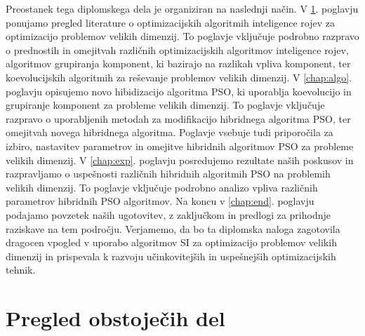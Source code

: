 Preostanek tega diplomskega dela je organiziran na naslednji način.
V \ref{chap:obsojeca.dela}. poglavju ponujamo pregled literature o optimizacijskih algoritmih inteligence rojev za optimizacijo problemov velikih dimenzij.
To poglavje vključuje podrobno razpravo o prednostih in omejitvah različnih optimizacijskih algoritmov inteligence rojev, algoritmov grupiranja komponent, ki bazirajo na razlikah vpliva komponent, ter koevolucijskih algoritmih za reševanje problemov velikih dimenzij.
V \ref{chap:algo}. poglavju opisujemo novo hibidizacijo algoritma PSO, ki uporablja koevolucijo in grupiranje komponent za probleme velikih dimenzij.
To poglavje vključuje razpravo o uporabljenih metodah za modifikacijo hibridnega algoritma PSO, ter omejitvah novega hibridnega algoritma.
Poglavje vsebuje tudi priporočila za izbiro, nastavitev parametrov in omejitve hibridnih algoritmov PSO za probleme velikih dimenzij.
V \ref{chap:exp}. poglavju posredujemo rezultate naših poskusov in razpravljamo o uspešnosti različnih hibridnih algoritmih PSO na problemih velikih dimenzij.
To poglavje vključuje podrobno analizo vpliva različnih parametrov hibridnih PSO algoritmov.
Na koncu v \ref{chap:end}. poglavju podajamo povzetek naših ugotovitev, z zaključkom in predlogi za prihodnje raziskave na tem področju. Verjamemo, da bo ta diplomska naloga zagotovila dragocen vpogled v uporabo algoritmov SI za optimizacijo problemov velikih dimenzij in prispevala k razvoju učinkovitejših in uspešnejših optimizacijskih tehnik.

\chapter{Pregled obstoječih del}\label{chap:obsojeca.dela}

